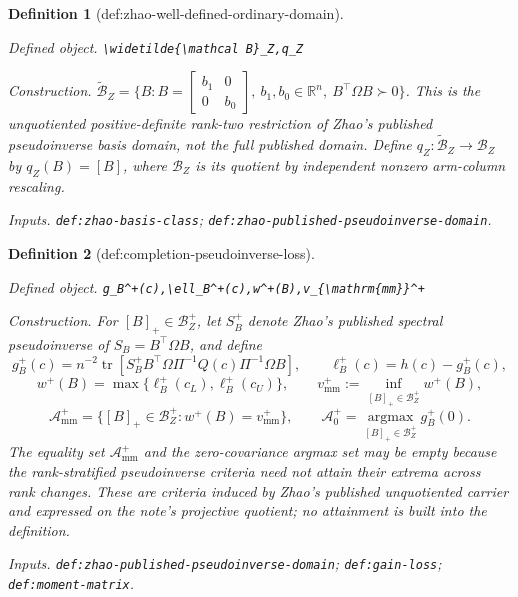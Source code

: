 \documentclass{article}
\newtheorem{definition}{Definition}
\begin{document}
\begin{definition}[def:zhao-well-defined-ordinary-domain]\label{def:zhao-well-defined-ordinary-domain}
\par\smallskip\noindent\emph{Defined object.} \texttt{\textbackslash{}\allowbreak{}widetilde\{\textbackslash{}\allowbreak{}mathcal B\}\allowbreak{}\_\allowbreak{}Z,\allowbreak{}q\_\allowbreak{}Z}
\par\smallskip\noindent\emph{Construction.} \(\widetilde{\mathcal B}_Z=\{B:B=\begin{bmatrix}b_1&0\\0&b_0\end{bmatrix},\ b_1,b_0\in\mathbb R^n,\ B^{\top}\Omega B\succ0\}\).  This is the unquotiented positive-definite rank-two restriction of Zhao's published pseudoinverse basis domain, not the full published domain.  Define \(q_Z:\widetilde{\mathcal B}_Z\to\mathcal B_Z\) by \(q_Z(B)=[B]\), where \(\mathcal B_Z\) is its quotient by independent nonzero arm-column rescaling.
\par\smallskip\noindent\emph{Inputs.} \texttt{def:\allowbreak{}zhao-\allowbreak{}basis-\allowbreak{}class}; \texttt{def:\allowbreak{}zhao-\allowbreak{}published-\allowbreak{}pseudoinverse-\allowbreak{}domain}.
\end{definition}

\begin{definition}[def:completion-pseudoinverse-loss]\label{def:completion-pseudoinverse-loss}
\par\smallskip\noindent\emph{Defined object.} \texttt{g\_\allowbreak{}B\textasciicircum{}+\allowbreak{}(c),\allowbreak{}\textbackslash{}\allowbreak{}ell\_\allowbreak{}B\textasciicircum{}+\allowbreak{}(c),\allowbreak{}w\textasciicircum{}+\allowbreak{}(B),\allowbreak{}v\_\allowbreak{}\{\textbackslash{}\allowbreak{}mathrm\{mm\}\allowbreak{}\}\allowbreak{}\textasciicircum{}+\allowbreak{}}
\par\smallskip\noindent\emph{Construction.} For \([B]_+\in\mathcal B_Z^+\), let \(S_B^+\) denote Zhao's published spectral pseudoinverse of \(S_B=B^{\top}\Omega B\), and define
\[
g_B^+(c)=n^{-2}\operatorname{tr}\!\left[S_B^+B^{\top}\Omega\Pi^{-1}Q(c)\Pi^{-1}\Omega B\right],
\qquad \ell_B^+(c)=h(c)-g_B^+(c),
\]
\[
w^+(B)=\max\{\ell_B^+(c_L),\ell_B^+(c_U)\},
\qquad v_{\mathrm{mm}}^+:=\inf_{[B]_+\in\mathcal B_Z^+}w^+(B),
\]
\[
\mathcal A_{\mathrm{mm}}^+
=\{[B]_+\in\mathcal B_Z^+:w^+(B)=v_{\mathrm{mm}}^+\},
\qquad \mathcal A_0^+=\operatorname*{argmax}_{[B]_+\in\mathcal B_Z^+}g_B^+(0).
\]
The equality set \(\mathcal A_{\mathrm{mm}}^+\) and the zero-covariance argmax set may be empty because the rank-stratified pseudoinverse criteria need not attain their extrema across rank changes.  These are criteria induced by Zhao's published unquotiented carrier and expressed on the note's projective quotient; no attainment is built into the definition.
\par\smallskip\noindent\emph{Inputs.} \texttt{def:\allowbreak{}zhao-\allowbreak{}published-\allowbreak{}pseudoinverse-\allowbreak{}domain}; \texttt{def:\allowbreak{}gain-\allowbreak{}loss}; \texttt{def:\allowbreak{}moment-\allowbreak{}matrix}.
\end{definition}
\end{document}
